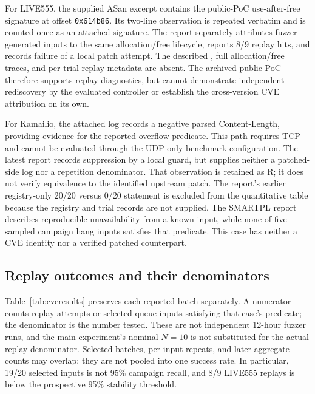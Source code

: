 For LIVE555, the supplied ASan excerpt contains the public-PoC use-after-free signature at offset \texttt{0x614b86}. Its two-line observation is repeated verbatim and is counted once as an attached signature. The report separately attributes fuzzer-generated inputs to the same allocation/free lifecycle, reports 8/9 replay hits, and records failure of a local patch attempt. The described , full allocation/free traces, and per-trial replay metadata are absent. The archived public PoC therefore supports replay diagnostics, but cannot demonstrate independent rediscovery by the evaluated controller or establish the cross-version CVE attribution on its own.

For Kamailio, the attached log records a negative parsed Content-Length, providing evidence for the reported overflow predicate. This path requires TCP and cannot be evaluated through the UDP-only benchmark configuration. The latest report records suppression by a local guard, but supplies neither a patched-side log nor a repetition denominator. That observation is retained as R; it does not verify equivalence to the identified upstream patch. The report's earlier registry-only 20/20 versus 0/20 statement is excluded from the quantitative table because the registry and trial records are not supplied. The SMARTPL report describes reproducible unavailability from a known input, while none of five sampled campaign hang inputs satisfies that predicate. This case has neither a CVE identity nor a verified patched counterpart.

\subsection{Replay outcomes and their denominators}
Table~\ref{tab:cveresults} preserves each reported batch separately. A numerator counts replay attempts or selected queue inputs satisfying that case's predicate; the denominator is the number tested. These are not independent 12-hour fuzzer runs, and the main experiment's nominal $N=10$ is not substituted for the actual replay denominator. Selected batches, per-input repeats, and later aggregate counts may overlap; they are not pooled into one success rate. In particular, 19/20 selected inputs is not 95\% campaign recall, and 8/9 LIVE555 replays is below the prospective 95\% stability threshold.

